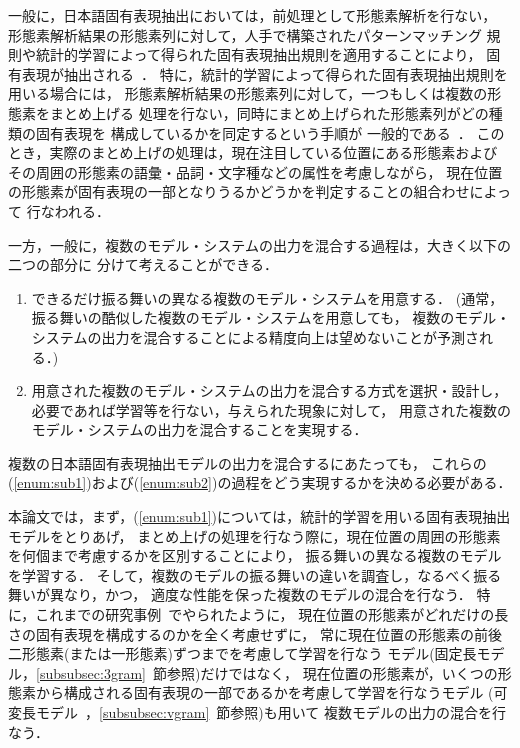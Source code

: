 一般に，日本語固有表現抽出においては，前処理として形態素解析を行ない，
形態素解析結果の形態素列に対して，人手で構築されたパターンマッチング
規則や統計的学習によって得られた固有表現抽出規則を適用することにより，
固有表現が抽出される~\cite{IREX99aj}．
特に，統計的学習によって得られた固有表現抽出規則を用いる場合には，
形態素解析結果の形態素列に対して，一つもしくは複数の形態素をまとめ上げる
処理を行ない，同時にまとめ上げられた形態素列がどの種類の固有表現を
構成しているかを同定するという手順が
一般的である~\cite{Sekine98a,Borthwick99aj,Uchimoto00aj,Sassano00a,Sassano00bjx,Yamada01ajx}．
このとき，実際のまとめ上げの処理は，現在注目している位置にある形態素および
その周囲の形態素の語彙・品詞・文字種などの属性を考慮しながら，
現在位置の形態素が固有表現の一部となりうるかどうかを判定することの組合わせによって
行なわれる．

一方，一般に，複数のモデル・システムの出力を混合する過程は，大きく以下の二つの部分に
分けて考えることができる．
\begin{enumerate}
\item \label{enum:sub1}
	できるだけ振る舞いの異なる複数のモデル・システムを用意する．
	(通常，振る舞いの酷似した複数のモデル・システムを用意しても，
	複数のモデル・システムの出力を混合することによる精度向上は望めないことが予測される．)
	
\item \label{enum:sub2}
	用意された複数のモデル・システムの出力を混合する方式を選択・設計し，
	必要であれば学習等を行ない，与えられた現象に対して，
	用意された複数のモデル・システムの出力を混合することを実現する．
\end{enumerate}
複数の日本語固有表現抽出モデルの出力を混合するにあたっても，
これらの(\ref{enum:sub1})および(\ref{enum:sub2})の過程をどう実現するかを決める必要がある．

本論文では，まず，(\ref{enum:sub1})については，統計的学習を用いる固有表現抽出モデルをとりあげ，
まとめ上げの処理を行なう際に，現在位置の周囲の形態素を何個まで考慮するかを区別することにより，
振る舞いの異なる複数のモデルを学習する．
そして，複数のモデルの振る舞いの違いを調査し，なるべく振る舞いが異なり，かつ，
適度な性能を保った複数のモデルの混合を行なう．
特に，これまでの研究事例~\cite{Sekine98a,Borthwick99aj,Uchimoto00aj,Yamada01ajx}でやられたように，
現在位置の形態素がどれだけの長さの固有表現を構成するのかを全く考慮せずに，
常に現在位置の形態素の前後二形態素(または一形態素)ずつまでを考慮して学習を行なう
モデル(固定長モデル，\ref{subsubsec:3gram}~節参照)だけではなく，
現在位置の形態素が，いくつの形態素から構成される固有表現の一部であるかを考慮して学習を行なうモデル
(可変長モデル~\cite{Sassano00a,Sassano00bjx}，\ref{subsubsec:vgram}~節参照)も用いて
複数モデルの出力の混合を行なう．

